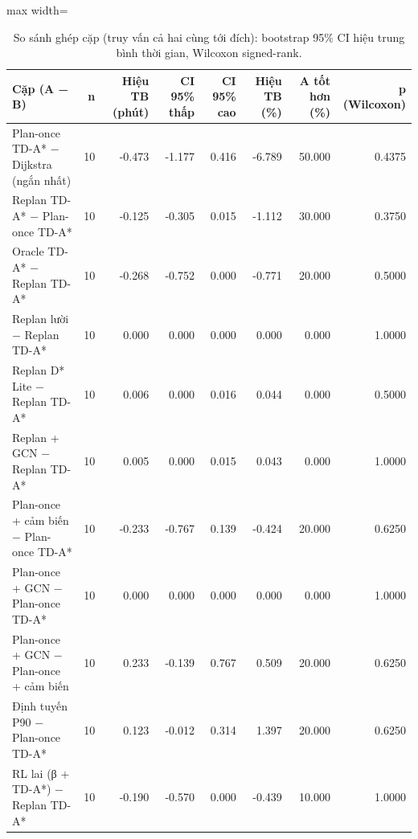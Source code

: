 \begin{table}[!htbp]
\centering
\small
\caption{So sánh ghép cặp (truy vấn cả hai cùng tới đích): bootstrap 95\% CI hiệu trung bình thời gian, Wilcoxon signed-rank.}
\label{tab:tab_stat_tests}
\begin{adjustbox}{max width=\linewidth}
\begin{tabular}{lrrrrrrr}
\toprule
Cặp (A − B) & n & Hiệu TB (phút) & CI 95\% thấp & CI 95\% cao & Hiệu TB (\%) & A tốt hơn (\%) & p (Wilcoxon) \\
\midrule
Plan-once TD-A* − Dijkstra (ngắn nhất) & 10 & -0.473 & -1.177 & 0.416 & -6.789 & 50.000 & 0.4375 \\
Replan TD-A* − Plan-once TD-A* & 10 & -0.125 & -0.305 & 0.015 & -1.112 & 30.000 & 0.3750 \\
Oracle TD-A* − Replan TD-A* & 10 & -0.268 & -0.752 & 0.000 & -0.771 & 20.000 & 0.5000 \\
Replan lười − Replan TD-A* & 10 & 0.000 & 0.000 & 0.000 & 0.000 & 0.000 & 1.0000 \\
Replan D* Lite − Replan TD-A* & 10 & 0.006 & 0.000 & 0.016 & 0.044 & 0.000 & 0.5000 \\
Replan + GCN − Replan TD-A* & 10 & 0.005 & 0.000 & 0.015 & 0.043 & 0.000 & 1.0000 \\
Plan-once + cảm biến − Plan-once TD-A* & 10 & -0.233 & -0.767 & 0.139 & -0.424 & 20.000 & 0.6250 \\
Plan-once + GCN − Plan-once TD-A* & 10 & 0.000 & 0.000 & 0.000 & 0.000 & 0.000 & 1.0000 \\
Plan-once + GCN − Plan-once + cảm biến & 10 & 0.233 & -0.139 & 0.767 & 0.509 & 20.000 & 0.6250 \\
Định tuyến P90 − Plan-once TD-A* & 10 & 0.123 & -0.012 & 0.314 & 1.397 & 20.000 & 0.6250 \\
RL lai (β + TD-A*) − Replan TD-A* & 10 & -0.190 & -0.570 & 0.000 & -0.439 & 10.000 & 1.0000 \\
\bottomrule
\end{tabular}
\end{adjustbox}
\end{table}
